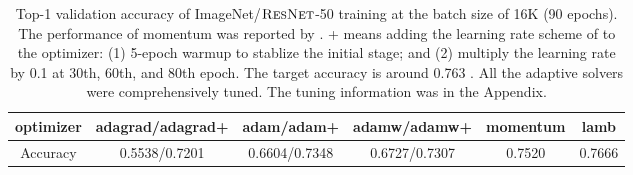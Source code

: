 \begin{table}[ht]
\renewcommand{\arraystretch}{1.3}
\caption{ Top-1 validation accuracy of ImageNet/$\textsc{ResNet}$-50 training at the batch size of 16K (90 epochs). The performance of momentum was reported by \citep{goyal2017accurate}. + means adding the learning rate scheme of \cite{goyal2017accurate} to the optimizer: (1) 5-epoch warmup to stablize the initial stage; and (2) multiply the learning rate by 0.1 at 30th, 60th, and 80th epoch. The target accuracy is around 0.763 \citep{goyal2017accurate}. All the adaptive solvers were comprehensively tuned. The tuning information was in the Appendix.}
\centering

\begin{tabular}{|c|c|c|c|c|c|}
\hline
optimizer & adagrad/adagrad+ & adam/adam+ & adamw/adamw+ & momentum & lamb \\
\hline
\hline
Accuracy & 0.5538/0.7201 & 0.6604/0.7348 & 0.6727/0.7307 & 0.7520 & 0.7666  \\
\hline
\end{tabular}
\label{table:resnet50_acc}
\end{table}

